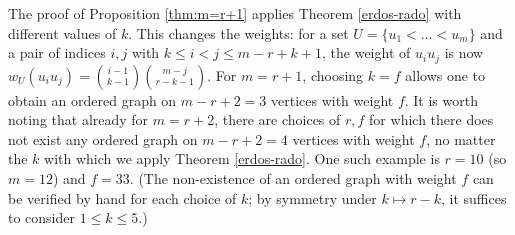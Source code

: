 \documentclass[11pt]{article}
\theoremstyle{plain}
\begin{document}
The proof of Proposition \ref{thm:m=r+1} applies Theorem \ref{erdos-rado} with different values of $k$. This changes the weights: for a set $U = \{u_1 < \dots < u_m\}$ and a pair of indices $i,j$ with $k \leq i < j \leq m-r+k+1$, the weight of $u_iu_j$ is now $w_U(u_iu_j) = \binom{i-1}{k-1}\binom{m-j}{r-k-1}$. For $m=r+1$, choosing $k=f$ allows one to obtain an ordered graph on $m-r+2 = 3$ vertices with weight $f$. 
It is worth noting that already for $m=r+2$, there are choices of $r,f$ for which there does not exist any ordered graph on $m-r+2=4$ vertices with weight $f$, no matter the $k$ with which we apply Theorem \ref{erdos-rado}. One such example is $r=10$ (so $m=12$) and $f=33$. (The non-existence of an ordered graph with weight $f$ can be verified by hand for each choice of $k$; by symmetry under $k \mapsto r-k$, it suffices to consider $1 \leq k \leq 5$.)



\end{document}
